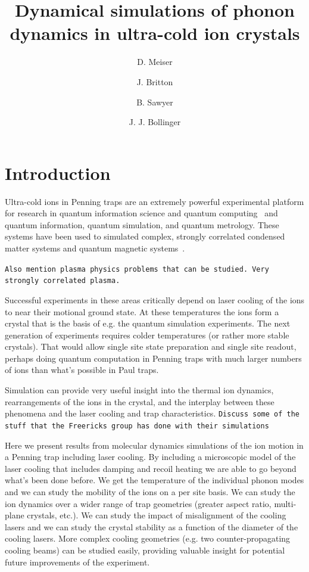 \documentclass[
  aps,
  reprint,
  twoside,
  showpacs,
  amsmath,
  amssymb,
  floatfix
]{revtex4-1}
\newcommand{\domcomment}[1]{{\tt #1}}
\begin{document}
\title{Dynamical simulations of phonon dynamics in ultra-cold ion
  crystals}
\author{D. Meiser}
\author{J. Britton}
\author{B. Sawyer}
\author{J. J. Bollinger}
\maketitle


\section{Introduction}
\label{sec:introduction}


Ultra-cold ions in Penning traps are an extremely powerful experimental
platform for research in quantum information science and quantum
computing~\cite{QuantumComputing} and quantum information, quantum
simulation, and quantum metrology.  These systems have been used to
simulated complex, strongly correlated condensed matter systems and
quantum magnetic systems~\cite{IsingStuff}.

\domcomment{Also mention plasma physics problems that can be studied.
  Very strongly correlated plasma.}

Successful experiments in these areas critically depend on laser cooling
of the ions to near their motional ground state.  At these temperatures
the ions form a crystal that is the basis of e.g. the quantum simulation
experiments.  The next generation of experiments requires colder
temperatures (or rather more stable crystals).  That would allow single
site state preparation and single site readout, perhaps doing quantum
computation in Penning traps with much larger numbers of ions than
what's possible in Paul traps.

Simulation can provide very useful insight into the thermal ion
dynamics, rearrangements of the ions in the crystal, and the interplay
between these phenomena and the laser cooling and trap characteristics.  
\domcomment{Discuss some of the stuff that the Freericks group has done
with their simulations}

Here we present results from molecular dynamics simulations of the ion
motion in a Penning trap including laser cooling.  By including a
microscopic model of the laser cooling that includes damping and recoil
heating we are able to go beyond what's been done before.  We get the
temperature of the individual phonon modes and we can study the mobility
of the ions on a per site basis.  We can study the ion dynamics over a
wider range of trap geometries (greater aspect ratio, multi-plane
    crystals, etc.).  We can study the impact of misalignment of the
cooling lasers and we can study the crystal stability as a function of
the diameter of the cooling lasers.  More complex cooling geometries
(e.g. two counter-propagating cooling beams) can be studied easily,
providing valuable insight for potential future improvements of the
experiment.
\end{document}
